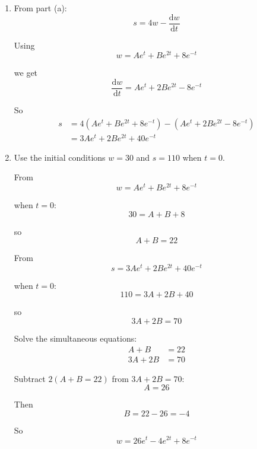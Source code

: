 \documentclass[leqno]{article}
\begin{document}
\begin{enumerate}[
  label=\textbf{\arabic*.},
  leftmargin=*,
  topsep=0pt,
  partopsep=0pt,
  parsep=0pt
]
\begin{djsSolution}
\begin{enumerate}[label=\textbf{(\alph*)}]
  Then
  \[
  \frac{\mathrm{d}w_p}{\mathrm{d}t}=-ae^{-t},
  \qquad
  \frac{\mathrm{d}^2w_p}{\mathrm{d}t^2}=ae^{-t}
  \]

  Substitute into the differential equation:
  \begin{align*}
  \frac{\mathrm{d}^2w_p}{\mathrm{d}t^2}-3\frac{\mathrm{d}w_p}{\mathrm{d}t}+2w_p
  &=ae^{-t}-3(-ae^{-t})+2ae^{-t} \\
  &=6ae^{-t}
  \end{align*}

  Comparing with \(48e^{-t}\):
  \[
  6a=48
  \]

  so
  \[
  a=8
  \]

  Therefore
  \[
  w_p=8e^{-t}
  \]

  Hence the general solution is
  \[
  w=w_c+w_p=Ae^t+Be^{2t}+8e^{-t}
  \]

  \item From part (a):
  \[
  s=4w-\frac{\mathrm{d}w}{\mathrm{d}t}
  \]

  Using
  \[
  w=Ae^t+Be^{2t}+8e^{-t}
  \]

  we get
  \[
  \frac{\mathrm{d}w}{\mathrm{d}t}=Ae^t+2Be^{2t}-8e^{-t}
  \]

  So
  \begin{align*}
  s
  &=4\left(Ae^t+Be^{2t}+8e^{-t}\right)-\left(Ae^t+2Be^{2t}-8e^{-t}\right) \\
  &=3Ae^t+2Be^{2t}+40e^{-t}
  \end{align*}

  \item Use the initial conditions \(w=30\) and \(s=110\) when \(t=0\).

  From
  \[
  w=Ae^t+Be^{2t}+8e^{-t}
  \]

  when \(t=0\):
  \[
  30=A+B+8
  \]

  so
  \[
  A+B=22
  \]

  From
  \[
  s=3Ae^t+2Be^{2t}+40e^{-t}
  \]

  when \(t=0\):
  \[
  110=3A+2B+40
  \]

  so
  \[
  3A+2B=70
  \]

  Solve the simultaneous equations:
  \begin{align*}
  A+B&=22 \\
  3A+2B&=70
  \end{align*}

  Subtract \(2(A+B=22)\) from \(3A+2B=70\):
  \[
  A=26
  \]

  Then
  \[
  B=22-26=-4
  \]

  So
  \[
  w=26e^t-4e^{2t}+8e^{-t}
  \]


\end{enumerate}
\end{djsSolution}
\end{enumerate}
\end{document}
